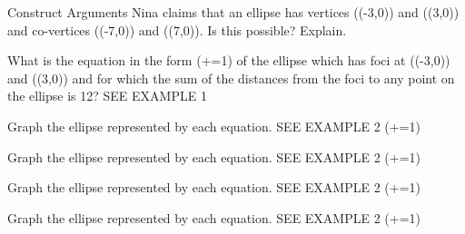\documentclass{article}
\newenvironment{practice}[2]{}{}        %
\newcommand{\answer}[1]{}               %
\newcommand{\placeholder}[2]{}          %
\begin{document}
\begin{practice}{14}{2}
Construct Arguments Nina claims that an ellipse has vertices ((-3,0)) and ((3,0)) and co-vertices ((-7,0)) and ((7,0)). Is this possible? Explain.
\answer{No; the vertices of an ellipse are the points farther away from the center, and the co-vertices are the points closer to the center.}
\end{practice}
\begin{practice}{15}{1}
What is the equation in the form (+=1) of the ellipse which has foci at ((-3,0)) and ((3,0)) and for which the sum of the distances from the foci to any point on the ellipse is 12? SEE EXAMPLE 1
\answer{(\frac{x^2}{36}+\frac{y^2}{27}=1)}
\end{practice}
\begin{practice}{16}{1}
Graph the ellipse represented by each equation. SEE EXAMPLE 2
(+=1)
\answer{See graph.}
\placeholder{graph}{Unit grid [-5,5] both axes, black x/y axes with arrows, O origin, labels +/-2,+/-4. Red vertical ellipse centered at origin, vertices (0,+/-3), co-vertices (+/-2,0).}
\end{practice}
\begin{practice}{17}{1}
Graph the ellipse represented by each equation. SEE EXAMPLE 2
(+=1)
\answer{See graph.}
\placeholder{graph}{Grid spacing 2, x window [-10,10], y [-12,8], black x/y axes arrows, O origin; x labels +/-4,+/-8; y 4,-4,-8. Red vertical ellipse center (1,-2), vertices (1,4),(1,-8), co-vertices (-2,-2),(4,-2).}
\end{practice}
\begin{practice}{18}{1}
Graph the ellipse represented by each equation. SEE EXAMPLE 2
(+=1)
\answer{See graph.}
\placeholder{graph}{Unit grid [-5,5] both axes, black x/y axes arrows, O origin, labels +/-2,+/-4. Red horizontal ellipse centered at origin, vertices (+/-5,0), co-vertices (0,+/-4).}
\end{practice}
\begin{practice}{19}{1}
Graph the ellipse represented by each equation. SEE EXAMPLE 2
(+=1)
\answer{See graph.}
\placeholder{graph}{Grid spacing 2, x window [-12,6], y [-8,10], black x/y axes arrows, O origin, x labels -8,-4,4; y -4,4,8. Red horizontal ellipse center (-3,1), vertices (-10,1),(4,1), co-vertices (-3,-3),(-3,5).}
\end{practice}
\end{document}
